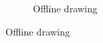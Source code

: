   \begin{figure}[!htbp]
    \centering
    \begin{subfigure}[tb]{0.45\textwidth}
        \caption{Offline drawing}
    \end{subfigure}


\end{figure}

